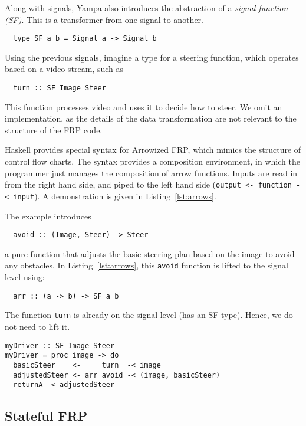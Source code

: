 Along with signals, Yampa also introduces the abstraction of a \textit{signal function (SF)}.
This is a transformer from one signal to another.

\begin{lstlisting}
  type SF a b = Signal a -> Signal b
\end{lstlisting}

\noindent Using the previous signals, imagine a type for a steering function, which operates based on a video stream, such as

\begin{lstlisting}
  turn :: SF Image Steer
\end{lstlisting}

\noindent This function processes video and uses it to decide how to steer.
We omit an implementation, as the details of the data transformation are not relevant to the structure of the FRP code.

Haskell provides special syntax for Arrowized FRP, which mimics the structure of control flow charts.
The syntax provides a composition environment, in which the programmer just manages the composition of arrow functions.
Inputs are read in from the right hand side, and piped to the left hand side (\texttt{output <- function -< input}).
A demonstration is given in Listing~\ref{lst:arrows}.

The example introduces 
%
\begin{lstlisting}
  avoid :: (Image, Steer) -> Steer
\end{lstlisting}
%
a pure function that adjusts the basic steering plan based on the image to avoid any obstacles.
In Listing~\ref{lst:arrows}, this \texttt{avoid} function is lifted to the signal level using:
%
\begin{lstlisting}
  arr :: (a -> b) -> SF a b
\end{lstlisting}
%
The function \texttt{turn} is already on the signal level (has an SF type). Hence, we do not need to lift it.

\begin{lstlisting}[float,floatplacement=h!,caption=Basic Arrowized FRP syntax,label=lst:arrows]
myDriver :: SF Image Steer
myDriver = proc image -> do
  basicSteer    <-     turn  -< image
  adjustedSteer <- arr avoid -< (image, basicSteer)
  returnA -< adjustedSteer
\end{lstlisting}


\subsection{Stateful FRP}

